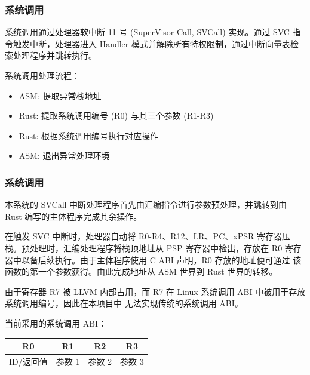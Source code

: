 \documentclass[aspectratio=169]{beamer}
\begin{document}
\begin{frame}

    \frametitle{系统调用}

    系统调用通过处理器软中断 11 号 (SuperVisor Call, SVCall) 实现。通过 SVC 指令触发中断，处理器进入 
    Handler 模式并解除所有特权限制，通过中断向量表检索处理程序并跳转执行。

    \par

    系统调用处理流程：
    
    \begin{itemize}
        \item ASM: 提取异常栈地址
        \item Rust: 提取系统调用编号 (R0) 与其三个参数 (R1-R3)
        \item Rust: 根据系统调用编号执行对应操作
        \item ASM: 退出异常处理环境
    \end{itemize}

\end{frame}

\begin{frame}

    \frametitle{系统调用}

    \par

    本系统的 SVCall 中断处理程序首先由汇编指令进行参数预处理，并跳转到由 Rust 编写的主体程序完成其余操作。

    \par

    在触发 SVC 中断时，处理器自动将 R0-R4、R12、LR、PC、xPSR 寄存器压栈。预处理时，汇编处理程序将栈顶地址从
    PSP 寄存器中检出，存放在 R0 寄存器中以备后续执行。由于主体程序使用 C ABI 声明，R0 存放的地址便可通过
    该函数的第一个参数获得。由此完成地址从 ASM 世界到 Rust 世界的转移。

    \par

    由于寄存器 R7 被 LLVM 内部占用，而 R7 在 Linux 系统调用 ABI 中被用于存放系统调用编号，因此在本项目中
    无法实现传统的系统调用 ABI。

    \par

    当前采用的系统调用 ABI：

    \begin{center}
        \begin{tabular}{ |c|c|c|c| }
            \hline
            R0 & R1 & R2 & R3 \\ \hline
            ID/返回值 & 参数 1 & 参数 2 & 参数 3 \\
            \hline
        \end{tabular}
    \end{center}
    
\end{frame}
\end{document}
